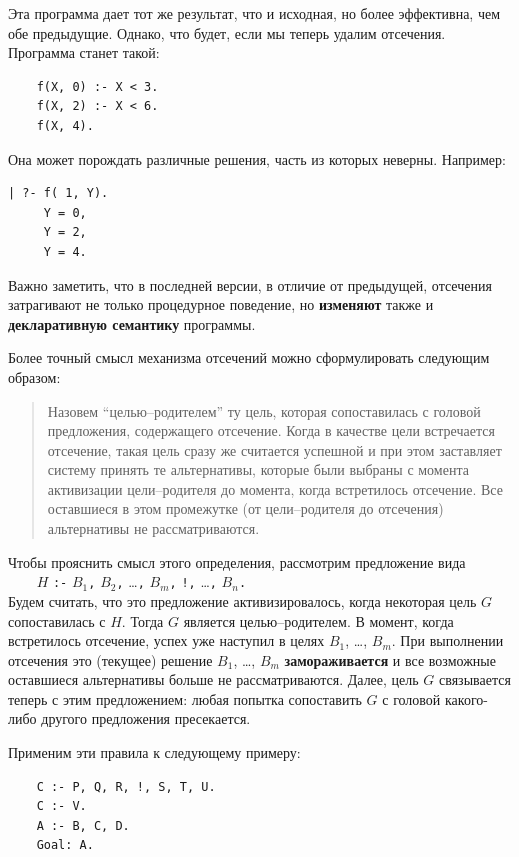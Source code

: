 \documentclass[12pt, openany, twoside]{book} %
\begin{document}
\noindent Эта программа дает тот же результат, что и исходная, но более эффективна, чем обе предыдущие. Однако, что будет, если мы теперь удалим отсечения. Программа станет такой:
{\tt \begin{verbatim}
    f(X, 0) :- X < 3.
    f(X, 2) :- X < 6.
    f(X, 4).
\end{verbatim}}
\noindent Она может порождать различные решения, часть из которых неверны. Например:

{\tt \begin{verbatim}
| ?- f( 1, Y).
     Y = 0,
     Y = 2,
     Y = 4.
 \end{verbatim}}

Важно заметить, что в последней версии, в отличие от предыдущей, отсечения затрагивают не только процедурное поведение, но {\bf изменяют} также и {\bf декларативную семантику} программы.

Более точный смысл механизма отсечений можно сформулировать следующим образом:
\begin{quote}
Назовем ``целью--родителем'' ту цель, которая сопоставилась с головой предложения, содержащего отсечение. Когда в качестве цели встречается отсечение, такая цель сразу же считается успешной и при этом заставляет систему принять те альтернативы, которые были выбраны с момента активизации цели--родителя до момента, когда встретилось отсечение. Все оставшиеся в этом промежутке (от цели--родителя до отсечения) альтернативы не рассматриваются.
\end{quote}

Чтобы прояснить смысл этого определения, рассмотрим предложение вида\\[1ex]
\verb|    |$H$ {\tt :-} $B_1${\tt,} $B_2${\tt,} \ldots {\tt ,} $B_m${\tt,}
    {\tt !,} \ldots {\tt ,} $B_n${\tt.}\\[-0.5ex]

\noindent Будем считать, что это предложение активизировалось, когда некоторая цель $G$ сопоставилась с $H$. Тогда $G$ является целью--родителем. В момент, когда встретилось отсечение, успех уже наступил в целях $B_1$, \ldots, $B_m$. При выполнении отсечения это (текущее) решение $B_1$, \ldots, $B_m$ {\bf замораживается} и все возможные оставшиеся альтернативы больше не рассматриваются. Далее, цель $G$ связывается теперь с этим предложением: любая попытка сопоставить $G$ с головой какого-либо другого предложения пресекается.

Применим эти правила к следующему примеру:
{\tt \begin{verbatim}
    С :- Р, Q, R, !, S, Т, U.
    С :- V.
    А :- В, С, D.
    Goal: А.
\end{verbatim}}
\end{document}
